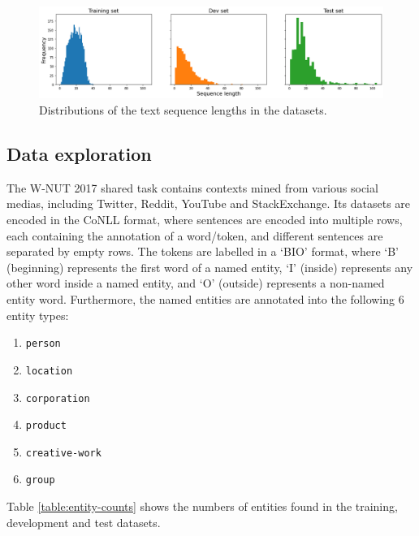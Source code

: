 \documentclass[11pt,a4paper]{article}
\begin{document}
\begin{figure}
    \centering
    \includegraphics[width=\textwidth]{figs/sequence-lengths-histogram.png}
    \caption{Distributions of the text sequence lengths in the datasets.}
    \label{fig:sequence-lengths}
\end{figure}

\subsection{Data exploration}

The W-NUT 2017 shared task \citep{derczynski-etal-2017-results} contains contexts mined from various social medias, including Twitter, Reddit, YouTube and StackExchange. Its datasets are encoded in the CoNLL format, where sentences are encoded into multiple rows, each containing the annotation of a word/token, and different sentences are separated by empty rows. The tokens are labelled in a `BIO' format, where `B' (beginning) represents the first word of a named entity, `I' (inside) represents any other word inside a named entity, and `O' (outside) represents a non-named entity word. Furthermore, the named entities are annotated into the following 6 entity types:
\begin{enumerate}[noitemsep]
    \item \texttt{person}
    \item \texttt{location}
    \item \texttt{corporation}
    \item \texttt{product}
    \item \texttt{creative-work}
    \item \texttt{group}
\end{enumerate}

Table \ref{table:entity-counts} shows the numbers of entities found in the training, development and test datasets.
\end{document}
